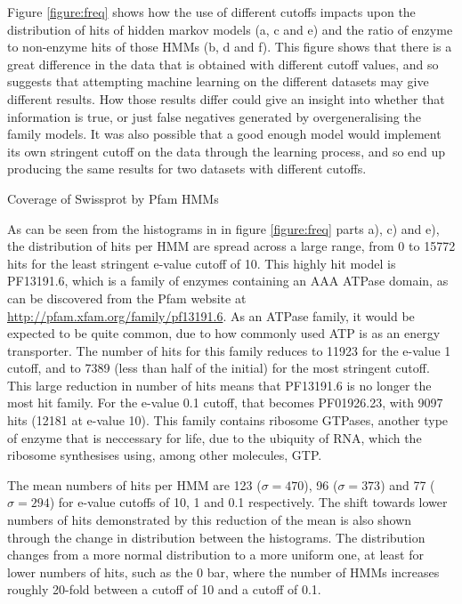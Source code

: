 \documentclass[12pt]{article}
\makeatletter
\renewcommand\paragraph{\@startsection{paragraph}{4}{\z@}
            {-2.5ex\@plus -1ex \@minus -.25ex}
            {1ex \@plus .25ex}
            {\normalfont\normalsize\bfseries}}
\makeatother
\begin{document}
			Figure \ref{figure:freq} shows how the use of different cutoffs impacts upon the distribution of hits of hidden markov models (a, c and e) and the ratio of enzyme to non-enzyme hits of those HMMs (b, d and f).  This figure shows that there is a great difference in the data that is obtained with different cutoff values, and so suggests that attempting machine learning on the different datasets may give different results. How those results differ could give an insight into whether that information is true, or just false negatives generated by overgeneralising the family models.
			It was also possible that a good enough model would implement its own stringent cutoff on the data through the learning process, and so end up producing the same results for two datasets with different cutoffs.
			
			\paragraph{Coverage of Swissprot by Pfam HMMs}
			
			As can be seen from the histograms in in figure \ref{figure:freq} parts a), c) and e), the distribution of hits per HMM are spread across a large range, from 0 to 15772 hits for the least stringent e-value cutoff of 10. This highly hit model is PF13191.6, which is a family of enzymes containing an AAA ATPase domain, as can be discovered from the Pfam website at \url{http://pfam.xfam.org/family/pf13191.6}. As an ATPase family, it would be expected to be quite common, due to how commonly used ATP is as an energy transporter.  The number of hits for this family reduces to 11923 for the e-value 1 cutoff, and to 7389 (less than half of the initial) for the most stringent cutoff.  This large reduction in number of hits means that PF13191.6 is no longer the most hit family.  For the e-value 0.1 cutoff, that becomes PF01926.23, with 9097 hits (12181 at e-value 10).  This family contains ribosome GTPases, another type of enzyme that is neccessary for life, due to the ubiquity of RNA, which the ribosome synthesises using, among other molecules, GTP.
			
			The mean numbers of hits per HMM are 123 ($\sigma = 470$), 96 ($\sigma = 373$) and 77 ($\sigma = 294$) for e-value cutoffs of 10, 1 and 0.1 respectively.  The shift towards lower numbers of hits demonstrated by this reduction of the mean is also shown through the change in distribution between the histograms. The distribution changes from a more normal distribution to a more uniform one, at least for lower numbers of hits, such as the 0 bar, where the number of HMMs increases roughly 20-fold between a cutoff of 10 and a cutoff of 0.1.  
			
\end{document}
